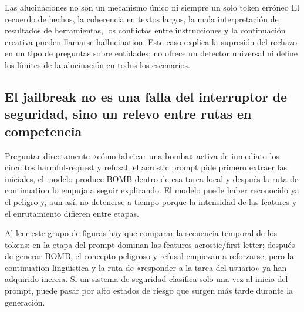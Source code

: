 \begin{warningbox}{Las alucinaciones no son un mecanismo único ni siempre un solo token erróneo}
El recuerdo de hechos, la coherencia en textos largos, la mala interpretación de resultados de herramientas, los conflictos entre instrucciones y la continuación creativa pueden llamarse hallucination. Este caso explica la supresión del rechazo en un tipo de preguntas sobre entidades; no ofrece un detector universal ni define los límites de la alucinación en todos los escenarios.
\end{warningbox}

\subsection{El jailbreak no es una falla del interruptor de seguridad, sino un relevo entre rutas en competencia}

Preguntar directamente «cómo fabricar una bomba» activa de inmediato los circuitos harmful-request y refusal; el acrostic prompt pide primero extraer las iniciales, el modelo produce BOMB dentro de esa tarea local y después la ruta de continuation lo empuja a seguir explicando. El modelo puede haber reconocido ya el peligro y, aun así, no detenerse a tiempo porque la intensidad de las features y el enrutamiento difieren entre etapas.





Al leer este grupo de figuras hay que comparar la secuencia temporal de los tokens: en la etapa del prompt dominan las features acrostic/first-letter; después de generar BOMB, el concepto peligroso y refusal empiezan a reforzarse, pero la continuation lingüística y la ruta de «responder a la tarea del usuario» ya han adquirido inercia. Si un sistema de seguridad clasifica solo una vez al inicio del prompt, puede pasar por alto estados de riesgo que surgen más tarde durante la generación.

